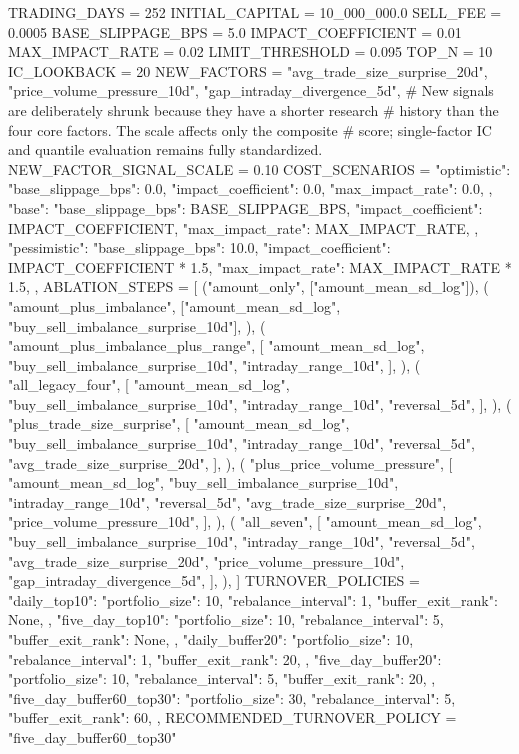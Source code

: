 \documentclass[UTF8,a4paper,fontset=fandol]{ctexart}
\begin{document}
\begin{ProjectCode}
TRADING_DAYS = 252
INITIAL_CAPITAL = 10_000_000.0
SELL_FEE = 0.0005
BASE_SLIPPAGE_BPS = 5.0
IMPACT_COEFFICIENT = 0.01
MAX_IMPACT_RATE = 0.02
LIMIT_THRESHOLD = 0.095
TOP_N = 10
IC_LOOKBACK = 20
NEW_FACTORS = {
    "avg_trade_size_surprise_20d",
    "price_volume_pressure_10d",
    "gap_intraday_divergence_5d",
}
# New signals are deliberately shrunk because they have a shorter research
# history than the four core factors.  The scale affects only the composite
# score; single-factor IC and quantile evaluation remains fully standardized.
NEW_FACTOR_SIGNAL_SCALE = 0.10
COST_SCENARIOS = {
    "optimistic": {
        "base_slippage_bps": 0.0,
        "impact_coefficient": 0.0,
        "max_impact_rate": 0.0,
    },
    "base": {
        "base_slippage_bps": BASE_SLIPPAGE_BPS,
        "impact_coefficient": IMPACT_COEFFICIENT,
        "max_impact_rate": MAX_IMPACT_RATE,
    },
    "pessimistic": {
        "base_slippage_bps": 10.0,
        "impact_coefficient": IMPACT_COEFFICIENT * 1.5,
        "max_impact_rate": MAX_IMPACT_RATE * 1.5,
    },
}
ABLATION_STEPS = [
    ("amount_only", ["amount_mean_sd_log"]),
    (
        "amount_plus_imbalance",
        ["amount_mean_sd_log", "buy_sell_imbalance_surprise_10d"],
    ),
    (
        "amount_plus_imbalance_plus_range",
        [
            "amount_mean_sd_log",
            "buy_sell_imbalance_surprise_10d",
            "intraday_range_10d",
        ],
    ),
    (
        "all_legacy_four",
        [
            "amount_mean_sd_log",
            "buy_sell_imbalance_surprise_10d",
            "intraday_range_10d",
            "reversal_5d",
        ],
    ),
    (
        "plus_trade_size_surprise",
        [
            "amount_mean_sd_log",
            "buy_sell_imbalance_surprise_10d",
            "intraday_range_10d",
            "reversal_5d",
            "avg_trade_size_surprise_20d",
        ],
    ),
    (
        "plus_price_volume_pressure",
        [
            "amount_mean_sd_log",
            "buy_sell_imbalance_surprise_10d",
            "intraday_range_10d",
            "reversal_5d",
            "avg_trade_size_surprise_20d",
            "price_volume_pressure_10d",
        ],
    ),
    (
        "all_seven",
        [
            "amount_mean_sd_log",
            "buy_sell_imbalance_surprise_10d",
            "intraday_range_10d",
            "reversal_5d",
            "avg_trade_size_surprise_20d",
            "price_volume_pressure_10d",
            "gap_intraday_divergence_5d",
        ],
    ),
]
TURNOVER_POLICIES = {
    "daily_top10": {
        "portfolio_size": 10,
        "rebalance_interval": 1,
        "buffer_exit_rank": None,
    },
    "five_day_top10": {
        "portfolio_size": 10,
        "rebalance_interval": 5,
        "buffer_exit_rank": None,
    },
    "daily_buffer20": {
        "portfolio_size": 10,
        "rebalance_interval": 1,
        "buffer_exit_rank": 20,
    },
    "five_day_buffer20": {
        "portfolio_size": 10,
        "rebalance_interval": 5,
        "buffer_exit_rank": 20,
    },
    "five_day_buffer60_top30": {
        "portfolio_size": 30,
        "rebalance_interval": 5,
        "buffer_exit_rank": 60,
    },
}
RECOMMENDED_TURNOVER_POLICY = "five_day_buffer60_top30"



\end{ProjectCode}
\end{document}
